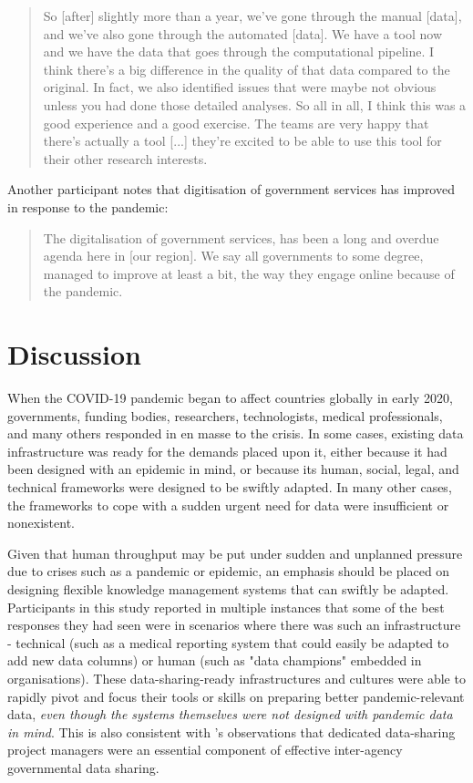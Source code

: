 \documentclass{CUP-JNL-DAP}%
\begin{document}
\blockquote{So [after] slightly more than a year, we've gone through the manual [data], and we've also gone through the automated [data]. We have a tool now and we have the data that goes through the computational pipeline. I think there's a big difference in the quality of that data compared to the original. In fact, we also identified issues that were maybe not obvious unless you had done those detailed analyses. So all in all, I think this was a good experience and a good exercise. The teams are very happy that there's actually a tool [...] they're excited to be able to use this tool for their other research interests.}

Another participant notes that digitisation of government services has improved in response to the pandemic: 

\blockquote{The digitalisation of government services, has been a long and overdue agenda here in [our region]. We say all governments to some degree, managed to improve at least a bit, the way they engage online because of the pandemic.}

\section{Discussion}

When the COVID-19 pandemic began to affect countries globally in early 2020, governments, funding bodies, researchers, technologists, medical professionals, and many others responded in en masse to the crisis. In some cases, existing data infrastructure was ready for the demands placed upon it, either because it had been designed with an epidemic in mind, or because its human, social, legal, and technical frameworks were designed to be swiftly adapted. In many other cases, the frameworks to cope with a sudden urgent need for data were insufficient or nonexistent. 


Given that human throughput may be put under sudden and unplanned pressure due to crises such as a pandemic or epidemic, an emphasis should be placed on designing flexible knowledge management systems that can swiftly be adapted. Participants in this study reported in multiple instances that some of the best responses they had seen were in scenarios where there was such an infrastructure - technical (such as a medical reporting system that could easily be adapted to add new data columns) or human (such as "data champions" embedded in organisations). These data-sharing-ready infrastructures and cultures were able to rapidly pivot and focus their tools or skills on preparing better pandemic-relevant data, \textit{even though the systems themselves were not designed with pandemic data in mind}. This is also consistent with \cite{gil-garcia_government_2016}'s observations that dedicated data-sharing project managers were an essential component of effective inter-agency governmental data sharing.
\end{document}
